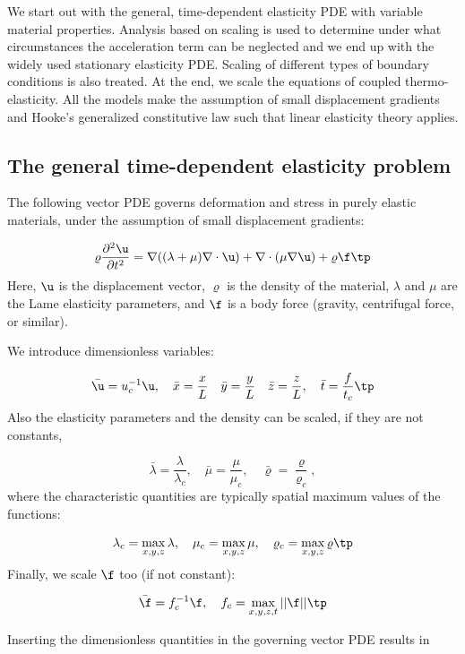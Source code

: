 \documentclass[graybox,envcountchap,sectrefs,final]{svmonodo}
\begin{document}
We start out with the general, time-dependent elasticity PDE with
variable material properties. Analysis based on scaling is used to
determine under what circumstances the acceleration term can be neglected
and we end up with the widely used stationary
elasticity PDE. Scaling of different types of boundary conditions is
also treated.  At the end, we scale the equations of coupled
thermo-elasticity. All the models make the assumption of small
displacement gradients and Hooke's generalized constitutive law
such that linear elasticity theory applies.

\subsection{The general time-dependent elasticity problem}
\label{scale:elasticity:timedep}

The following vector PDE governs deformation and stress in purely elastic
materials, under the assumption of small displacement gradients:

\begin{equation}
\varrho\frac{\partial^2\u}{\partial t^2} =
\nabla ((\lambda + \mu)\nabla\cdot\u) + \nabla\cdot(\mu\nabla\u) +
\varrho\f\tp
\label{scale:elasticity:PDE1}
\end{equation}
Here, $\u$ is the displacement vector,
$\varrho$ is the density of the material, $\lambda$ and $\mu$ are
the Lame elasticity parameters, and $\f$ is a body force (gravity,
centrifugal force, or similar).

We introduce dimensionless variables:

\[ \bar\u = u_c^{-1}\u,\quad \bar x = \frac{x}{L}
\quad \bar y = \frac{y}{L}
\quad \bar z = \frac{z}{L},
\quad \bar t = \frac{f}{t_c}\tp\]
Also the elasticity parameters and the density can be scaled, if they
are not constants,

\[ \bar\lambda = \frac{\lambda}{\lambda_c},\quad
\bar\mu = \frac{\mu}{\mu_c},\quad
\bar\varrho = \frac{\varrho}{\varrho_c},\]
where the characteristic quantities are typically spatial maximum values of
the functions:

\[ \lambda_c = \max_{x,y,z}\lambda,\quad
\mu_c = \max_{x,y,z}\mu,\quad
\varrho_c = \max_{x,y,z}\varrho\tp\]
Finally, we scale $\f$ too (if not constant):

\[ \bar\f = f_c^{-1}\f,\quad f_c = \max_{x,y,z,t}||\f||\tp\]

Inserting the dimensionless quantities in the governing vector PDE results in
\end{document}
